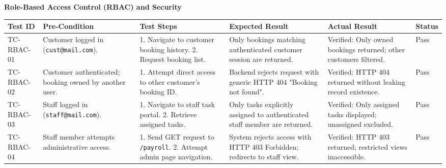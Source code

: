 \documentclass[12pt, letterpaper]{article}
\begin{document}
\newpage

\begin{landscape}


\begin{center}\textbf{Role-Based Access Control (RBAC) and Security}\end{center}
\centering


\begin{tabular}{p{2.2cm} p{3.8cm} p{5cm} p{5cm} p{3.5cm} p{1.5cm}}
\toprule
\textbf{Test ID} & \textbf{Pre-Condition} & \textbf{Test Steps} & \textbf{Expected Result} & \textbf{Actual Result} & \textbf{Status} \\
\midrule
TC-RBAC-01 & Customer logged in (\texttt{cust@mail.com}). & 1. Navigate to customer booking history. 2. Request booking list. & Only bookings matching authenticated customer session are returned. & Verified: Only owned bookings returned; other customers filtered. & Pass \\
TC-RBAC-02 & Customer authenticated; booking owned by another user. & 1. Attempt direct access to other customer's booking ID. & Backend rejects request with generic HTTP 404 "Booking not found". & Verified: HTTP 404 returned without leaking record existence. & Pass \\
TC-RBAC-03 & Staff logged in (\texttt{staff@mail.com}). & 1. Navigate to staff task portal. 2. Retrieve assigned tasks. & Only tasks explicitly assigned to authenticated staff member are returned. & Verified: Only assigned tasks displayed; unassigned excluded. & Pass \\
TC-RBAC-04 & Staff member attempts administrative access. & 1. Send GET request to \texttt{/payroll}. 2. Attempt admin page navigation. & System rejects access with HTTP 403 Forbidden; redirects to staff view. & Verified: HTTP 403 returned; restricted views inaccessible. & Pass \\
\bottomrule
\end{tabular}


\end{landscape}


\clearpage

\newpage
\end{document}
